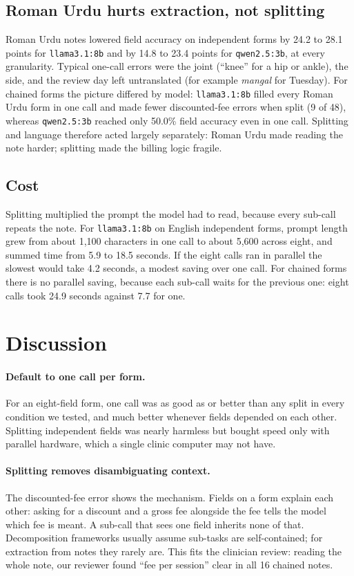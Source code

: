 \documentclass[11pt,a4paper]{article}
\newcommand{\code}[1]{\texttt{#1}}
\begin{document}
\subsection{Roman Urdu hurts extraction, not splitting}

Roman Urdu notes lowered field accuracy on independent forms by 24.2 to 28.1 points for \code{llama3.1:8b} and by 14.8
to 23.4 points for \code{qwen2.5:3b}, at every granularity. Typical one-call errors were the joint (``knee'' for a hip
or ankle), the side, and the review day left untranslated (for example \emph{mangal} for Tuesday). For chained forms
the picture differed by model: \code{llama3.1:8b} filled every Roman Urdu form in one call and made fewer
discounted-fee errors when split (9 of 48), whereas \code{qwen2.5:3b} reached only 50.0\% field accuracy even in one
call. Splitting and language therefore acted largely separately: Roman Urdu made reading the note harder; splitting
made the billing logic fragile.

\subsection{Cost}

Splitting multiplied the prompt the model had to read, because every sub-call repeats the note. For \code{llama3.1:8b}
on English independent forms, prompt length grew from about 1,100 characters in one call to about 5,600 across eight,
and summed time from 5.9 to 18.5 seconds. If the eight calls ran in parallel the slowest would take 4.2 seconds, a
modest saving over one call. For chained forms there is no parallel saving, because each sub-call waits for the
previous one: eight calls took 24.9 seconds against 7.7 for one.

\section{Discussion}

\paragraph{Default to one call per form.} For an eight-field form, one call was as good as or better than any split in
every condition we tested, and much better whenever fields depended on each other. Splitting independent fields was
nearly harmless but bought speed only with parallel hardware, which a single clinic computer may not have.

\paragraph{Splitting removes disambiguating context.} The discounted-fee error shows the mechanism. Fields on a form
explain each other: asking for a discount and a gross fee alongside the fee tells the model which fee is meant. A
sub-call that sees one field inherits none of that. Decomposition frameworks usually assume sub-tasks are
self-contained; for extraction from notes they rarely are. This fits the clinician review: reading the whole note, our reviewer found ``fee per session'' clear in all 16 chained notes.
\end{document}
